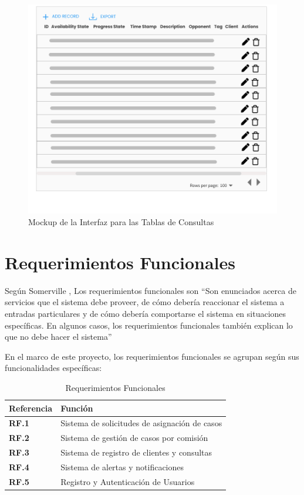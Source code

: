 \begin{figure}[H]
\centering
\includegraphics[width=1\linewidth]{fig/table-comment-gui.png}
\caption{Mockup de la Interfaz para las Tablas de Consultas}
\label{fig:table-consult-gui}
\end{figure}



\section{Requerimientos Funcionales}
Según Somerville \cite{Somerville}, Los requerimientos funcionales son ``Son enunciados acerca de servicios que el sistema
debe proveer, de cómo debería reaccionar el sistema a entradas particulares y de cómo debería comportarse el sistema en situaciones específicas. En algunos casos, los requerimientos funcionales también explican lo que no debe hacer el sistema''

En el marco de este proyecto, los requerimientos funcionales se agrupan según sus funcionalidades específicas:

\begin{table}[H]
\centering
\begin{tabular}{|l|l|}
\hline
\textbf{Referencia} & \textbf{Función} \\
\hline
\textbf{RF.1} & Sistema de solicitudes de asignación de casos \\
\hline
\textbf{RF.2} & Sistema de gestión de casos por comisión \\
\hline
\textbf{RF.3} & Sistema de registro de clientes y consultas \\
\hline
\textbf{RF.4} & Sistema de alertas y notificaciones \\
\hline
\textbf{RF.5} & Registro y Autenticación de Usuarios \\
\hline
\end{tabular}
\caption{Requerimientos Funcionales}
\label{tab:rf}
\end{table}



